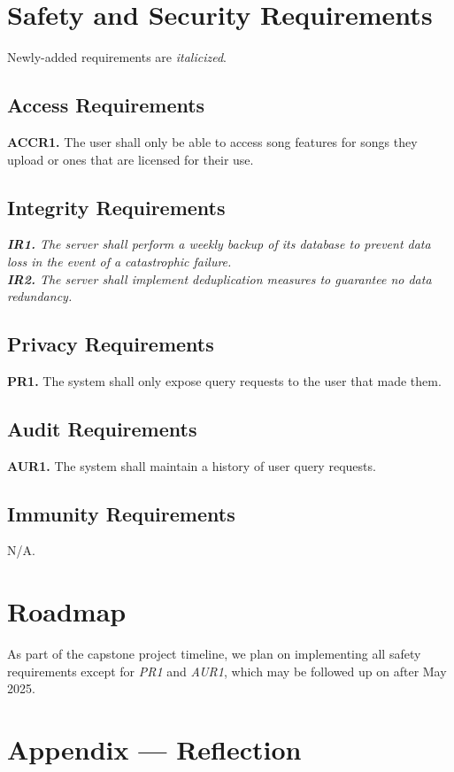 \documentclass{article}
\begin{document}
\section{Safety and Security Requirements}
Newly-added requirements are \emph{italicized}.
\subsection{Access Requirements}
\textbf{ACCR1.} The user shall only be able to access song features for songs they upload or ones that are licensed for their use.

\subsection{Integrity Requirements}
\emph{\textbf{IR1.} The server shall perform a weekly backup of its database to prevent data loss in the event of a catastrophic failure.} \\
\emph{\textbf{IR2.} The server shall implement deduplication measures to guarantee no data redundancy.}

\subsection{Privacy Requirements}
\textbf{PR1.} The system shall only expose query requests to the user that made them.

\subsection{Audit Requirements}
\textbf{AUR1.} The system shall maintain a history of user query requests.

\subsection{Immunity Requirements}
N/A.

\section{Roadmap}
As part of the capstone project timeline, we plan on implementing all safety requirements except for \emph{PR1} and \emph{AUR1}, which may be followed up on after May 2025.

\newpage{}

\section*{Appendix --- Reflection}
\end{document}
